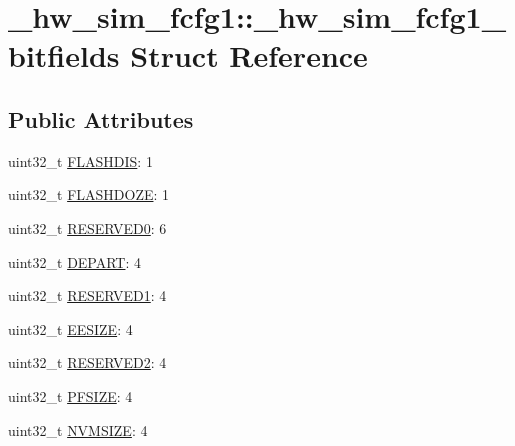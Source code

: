 \hypertarget{struct__hw__sim__fcfg1_1_1__hw__sim__fcfg1__bitfields}{}\section{\+\_\+hw\+\_\+sim\+\_\+fcfg1\+:\+:\+\_\+hw\+\_\+sim\+\_\+fcfg1\+\_\+bitfields Struct Reference}
\label{struct__hw__sim__fcfg1_1_1__hw__sim__fcfg1__bitfields}
\subsection*{Public Attributes}
\begin{DoxyCompactItemize}
\item 
uint32\+\_\+t \hyperlink{struct__hw__sim__fcfg1_1_1__hw__sim__fcfg1__bitfields_a02464d1d55fc676c408248a6cb561f3e}{F\+L\+A\+S\+H\+D\+IS}\+: 1
\item 
uint32\+\_\+t \hyperlink{struct__hw__sim__fcfg1_1_1__hw__sim__fcfg1__bitfields_a6d3fc60e43b899097b836467ca65287b}{F\+L\+A\+S\+H\+D\+O\+ZE}\+: 1
\item 
uint32\+\_\+t \hyperlink{struct__hw__sim__fcfg1_1_1__hw__sim__fcfg1__bitfields_a03d3b7a95f79d75a50b697d1bbbaffa2}{R\+E\+S\+E\+R\+V\+E\+D0}\+: 6
\item 
uint32\+\_\+t \hyperlink{struct__hw__sim__fcfg1_1_1__hw__sim__fcfg1__bitfields_a6d3f9fa91fcb6abd57de2fb47de4ddd4}{D\+E\+P\+A\+RT}\+: 4
\item 
uint32\+\_\+t \hyperlink{struct__hw__sim__fcfg1_1_1__hw__sim__fcfg1__bitfields_abe12973255f523fe5ca23a447478cab0}{R\+E\+S\+E\+R\+V\+E\+D1}\+: 4
\item 
uint32\+\_\+t \hyperlink{struct__hw__sim__fcfg1_1_1__hw__sim__fcfg1__bitfields_a52b2ae3381d3cc5af3e243e98d784cb4}{E\+E\+S\+I\+ZE}\+: 4
\item 
uint32\+\_\+t \hyperlink{struct__hw__sim__fcfg1_1_1__hw__sim__fcfg1__bitfields_a3b919aa023e571dbac99cf72990ccc6f}{R\+E\+S\+E\+R\+V\+E\+D2}\+: 4
\item 
uint32\+\_\+t \hyperlink{struct__hw__sim__fcfg1_1_1__hw__sim__fcfg1__bitfields_ab0f30fab4ba56c025be61d24f24a8da3}{P\+F\+S\+I\+ZE}\+: 4
\item 
uint32\+\_\+t \hyperlink{struct__hw__sim__fcfg1_1_1__hw__sim__fcfg1__bitfields_a3c09c64729ac111516d9b33104320f27}{N\+V\+M\+S\+I\+ZE}\+: 4
\end{DoxyCompactItemize}


